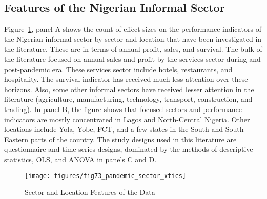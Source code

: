 \documentclass[a4paper, 12pt]{article}
\begin{document}
    \subsection{Features of the Nigerian Informal Sector}\label{subsec4.1:features-of-the-informal-sector}
    Figure~\ref{fig2:pandemic-sector-xtics}, panel A shows the count of effect sizes on the performance indicators of the Nigerian informal sector by sector and location that have been investigated in the literature. These are in terms of annual profit, sales, and survival. The bulk of the literature focused on annual sales and profit by the services sector during and post-pandemic era. These services sector include hotels, restaurants, and hospitality. The survival indicator has received much less attention over these horizons. Also, some other informal sectors have received lesser attention in the literature (agriculture, manufacturing, technology, transport, construction, and trading). In panel B, the figure shows that focused sectors and performance indicators are mostly concentrated in Lagos and North-Central Nigeria. Other locations include Yola, Yobe, FCT, and a few states in the South and South-Eastern parts of the country. The study designs used in this literature are questionnaire and time series designs, dominated by the methods of descriptive statistics, OLS, and ANOVA in panels C and D.

    \begin{figure}[H]
        \centering
        \texttt{[image: figures/fig73\_pandemic\_sector\_xtics]}
        \caption{Sector and Location Features of the Data}
        \label{fig2:pandemic-sector-xtics}
    \end{figure}

\end{document}

